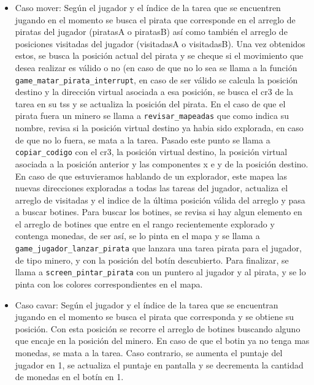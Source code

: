 \begin{enumerate}
\begin{itemize}
\item Caso mover: Según el jugador y el índice de la tarea que se encuentren jugando en el momento se busca el pirata que corresponde en el arreglo de piratas del jugador (piratasA o piratasB) así como también el arreglo de posiciones visitadas del jugador (visitadasA o visitadasB). Una vez obtenidos estos, se busca la posición actual del pirata y se cheque si el movimiento que desea realizar es válido o no (en caso de que no lo sea se llama a la función {\tt game\_matar\_pirata\_interrupt}, en caso de ser válido se calcula la posición destino y la dirección virtual asociada a esa posición, se busca el cr3 de la tarea en su tss y se actualiza la posición del pirata. En el caso de que el pirata fuera un minero se llama a {\tt revisar\_mapeadas} que como indica su nombre, revisa si la posición virtual destino ya habia sido explorada, en caso de que no lo fuera, se mata a la tarea.
Pasado este punto se llama a {\tt copiar\_codigo} con el cr3, la posición virtual destino, la posición virtual asociada a la posición anterior y las componentes x e y de la posición destino.
En caso de que estuvieramos hablando de un explorador, este mapea las nuevas direcciones exploradas a todas las tareas del jugador, actualiza el arreglo de visitadas y el indice de la última posición válida del arreglo y pasa a buscar botines. Para buscar los botines, se revisa si hay algun elemento en el arreglo de botines que entre en el rango recientemente explorado y contenga monedas, de ser así, se lo pinta en el mapa y se llama a {\tt game\_jugador\_lanzar\_pirata} que lanzara una tarea pirata para el jugador, de tipo minero, y con la posición del botín descubierto. Para finalizar, se llama a {\tt screen\_pintar\_pirata} con un puntero al jugador y al pirata, y se lo pinta con los colores correspondientes en el mapa.


\item Caso cavar: Según el jugador y el índice de la tarea que se encuentran jugando en el momento se busca el pirata que corresponda y se obtiene su posición. Con esta posición se recorre el arreglo de botines buscando alguno que encaje en la posición del minero. En caso de que el botin ya no tenga mas monedas, se mata a la tarea. Caso contrario, se aumenta el puntaje del jugador en 1, se actualiza el puntaje en pantalla y se decrementa la cantidad de monedas en el botín en 1.


\end{itemize}
\end{enumerate}

